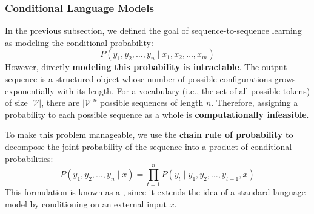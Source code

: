 \subsubsection{Conditional Language Models}

In the previous subsection, we defined the goal of sequence-to-sequence learning as modeling the conditional probability:
\begin{equation*}
    P\left(y_1, y_2, \dots, y_n \mid x_1, x_2, \dots, x_m\right)
\end{equation*}
However, directly \textbf{modeling this probability is intractable}. The output sequence is a structured object whose number of possible configurations grows exponentially with its length. For a vocabulary (i.e., the set of all possible tokens) of size $\left|\mathcal{V}\right|$, there are $\left|\mathcal{V}\right|^{n}$ possible sequences of length $n$. Therefore, assigning a probability to each possible sequence as a whole is \textbf{computationally infeasible}.

\highspace
To make this problem manageable, we use the \textbf{chain rule of probability} to decompose the joint probability of the sequence into a product of conditional probabilities:
\begin{equation}
    P\left(y_1, y_2, \dots, y_n \mid x\right)
    =
    \prod_{t=1}^{n}
    P\left(y_t \mid y_1, y_2, \dots, y_{t-1}, x\right)
\end{equation}
This formulation is known as a , since it extends the idea of a standard language model by conditioning on an external input $x$.


